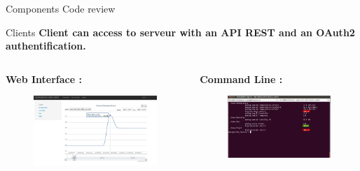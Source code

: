 \documentclass{beamer}
\begin{document}
\begin{frame}{Components}
Code review
\end{frame}

\begin{frame}{Clients}
\textbf{Client can access to serveur with an API REST and an OAuth2 authentification.}
\vfill
\begin{columns}
\begin{column}[l]{0.5\textwidth}
\textbf{Web Interface :}
\vfill
\begin{figure}
\includegraphics[width=\columnwidth]{./figures/oposweb.png}
\end{figure}
\end{column}
\begin{column}[r]{0.5\textwidth}
\textbf{Command Line :}
\vfill
\begin{figure}
\includegraphics[width=\columnwidth]{./figures/oposcli.png}
\end{figure}
\end{column}
\end{columns}

\end{frame}
\end{document}
